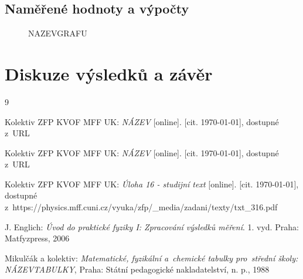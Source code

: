 \documentclass{../concepts/titul_zprava_p/prepareprotokolZprava} %
\begin{document}
\subsection{Naměřené hodnoty a výpočty}

\begin{figure}
    \centering
    \caption{NAZEVGRAFU}
    \label{fig:graf}
\end{figure}


\section{Diskuze výsledků a závěr}



\begin{thebibliography}{9}

 Kolektiv ZFP KVOF MFF UK: \textit{NÁZEV} [online]. 
[cit. \today], dostupné z~URL

 Kolektiv ZFP KVOF MFF UK: \textit{NÁZEV} [online]. [cit. \today], dostupné
z~URL

 Kolektiv ZFP KVOF MFF UK: \textit{Úloha 16 - studijní text} 
[online]. [cit. \today], dostupné
z~https://physics.mff.cuni.cz/vyuka/zfp/\_media/zadani/texty/txt\_316.pdf

 J. Englich: \textit{Úvod do praktické fyziky I: Zpracování výsledků měření}. 
1. vyd. Praha: Matfyzpress, 2006

 Mikulčák a kolektiv: \textit{Matematické, fyzikální a~chemické tabulky pro~střední 
školy: NÁZEVTABULKY}, Praha: Státní pedagogické nakladatelství, n. p., 1988

\end{thebibliography}
\end{document}
